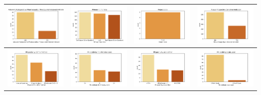 \begin{center} 
	\begin{tabular}{ |c|c|c|c| }  
		\hline
		\includegraphics[width=.25\textwidth]{NOTEBOOK/IMAGENES_CRUDAS/85} 
		& \includegraphics[width=.25\textwidth]{NOTEBOOK/IMAGENES_CRUDAS/86} 
		& \includegraphics[width=.25\textwidth]{NOTEBOOK/IMAGENES_CRUDAS/87} 
		& \includegraphics[width=.25\textwidth]{NOTEBOOK/IMAGENES_CRUDAS/88} 
		\\  \hline 
		\includegraphics[width=.25\textwidth]{NOTEBOOK/IMAGENES_CRUDAS/89} 
		& \includegraphics[width=.25\textwidth]{NOTEBOOK/IMAGENES_CRUDAS/90} 
		& \includegraphics[width=.25\textwidth]{NOTEBOOK/IMAGENES_CRUDAS/91} 
		& \includegraphics[width=.25\textwidth]{NOTEBOOK/IMAGENES_CRUDAS/92}   

\end{tabular}
\end{center}
